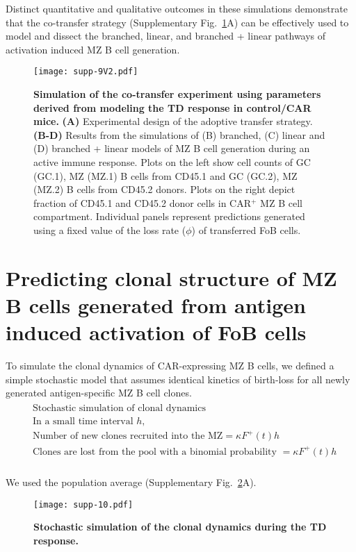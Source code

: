 \documentclass[11pt]{article}
\begin{document}
Distinct quantitative and qualitative outcomes in these simulations demonstrate that the co-transfer strategy (Supplementary Fig.~\ref{fig:co-transf}A) can be effectively used to model and dissect the branched, linear, and branched + linear pathways of activation induced MZ B cell generation.

 
 
\clearpage


\begin{figure}[htbp]
\center
\texttt{[image: supp-9V2.pdf]}
\caption{
    \textbf{Simulation of the co-transfer experiment using parameters derived from modeling the TD response in control/CAR mice.}
    \textbf{(A)} Experimental design of the adoptive transfer strategy.
    \textbf{(B-D)} Results from the simulations of (B) branched, (C) linear and (D) branched + linear models of MZ B cell generation during an active immune response.
    Plots on the left  show cell counts of GC (GC.1), MZ (MZ.1) B cells from CD45.1 and GC (GC.2), MZ (MZ.2) B cells from CD45.2 donors.
    Plots on the right depict fraction of CD45.1 and CD45.2 donor cells in CAR$^+$ MZ B cell compartment.
    Individual panels represent predictions generated using a fixed value of the loss rate ($\phi$) of transferred FoB cells.
    }
       \label{fig:co-transf}
 \end{figure}
 
 
\clearpage


\section*{Predicting clonal structure of MZ B cells generated from antigen induced activation of FoB cells}

To simulate the clonal dynamics of CAR-expressing MZ B cells, we defined a simple stochastic model that assumes identical kinetics of birth-loss for all newly generated antigen-specific MZ B cell clones.
\begin{eqnarray*}
\begin{aligned}
&\text{Stochastic simulation of clonal dynamics} \\
&\text{In a small time interval } h, \\
&\text{Number of new clones recruited into the MZ} = \kappa  F^+(t) h \\
&\text{Clones are lost from the pool with a binomial probability } = \kappa  F^+(t) h \\
\end{aligned}
\end{eqnarray*}
  
We used the 
population average
 (Supplementary Fig.~\ref{fig:clone-dyn}A).


\clearpage



\begin{figure}[htbp]
\center
\texttt{[image: supp-10.pdf]}
\caption{
    \textbf{Stochastic simulation of the clonal dynamics during the TD response.}
    }
       \label{fig:clone-dyn}
       
 \end{figure}
\end{document}
